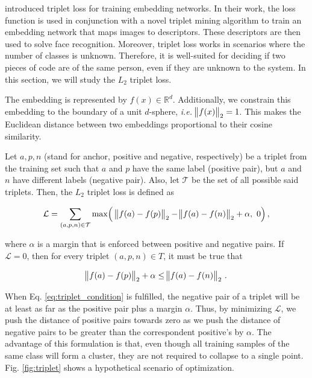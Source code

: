  introduced triplet loss for training embedding networks. In their work, the loss function is used in conjunction with a novel triplet mining algorithm to train an embedding network that maps images to descriptors. These descriptors are then used to solve face recognition. Moreover, triplet loss works in scenarios where the number of classes is unknown. Therefore, it is well-suited for deciding if two pieces of code are of the same person, even if they are unknown to the system. In this section, we will study the $L_2$ triplet loss.

The embedding is represented by $f(x) \in \mathbb{R}^d$. Additionally, we constrain this embedding to the boundary of a unit $d$-sphere, \textit{i.e.} $\norm{f(x)}_2 = 1$. This makes the Euclidean distance between two embeddings proportional to their cosine similarity.

Let $a, p, n$ (stand for anchor, positive and negative, respectively) be a triplet from the training set such that $a$ and $p$ have the same label (positive pair), but $a$ and $n$ have different labels (negative pair). Also, let $\mathcal{T}$ be the set of all possible said triplets. Then, the $L_2$ triplet loss is defined as

\begin{equation}\label{eq:triplet}
\mathcal{L} = \sum_{(a, p, n) \in \mathcal{T}} %
\max\Bigl(\ \norm{f(a) - f(p)}_2 - \norm{f(a) - f(n)}_2 + \alpha,\ 0\Bigr)\,,
\end{equation}

where $\alpha$ is a margin that is enforced between positive and negative pairs. If $\mathcal{L} = 0$, then for every triplet $(a, p, n) \in T$, it must be true that

\begin{equation}\label{eq:triplet_condition}
\norm{f(a) - f(p)}_2 + \alpha \leq \norm{f(a) - f(n)}_2 \,.
\end{equation}

When Eq. \ref{eq:triplet_condition} is fulfilled, the negative pair of a triplet will be at least as far as the positive pair plus a margin $\alpha$. Thus, by minimizing $\mathcal{L}$, we push the distance of positive pairs towards zero as we push the distance of negative pairs to be greater than the correspondent positive's by $\alpha$. The advantage of this formulation is that, even though all training samples of the same class will form a cluster, they are not required to collapse to a single point. Fig. \ref{fig:triplet} shows a hypothetical scenario of optimization.

